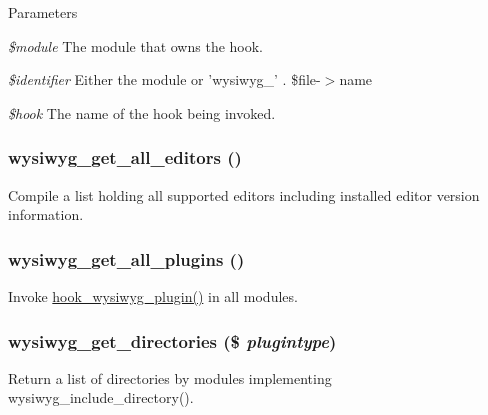\begin{DoxyParams}{Parameters}
\item[{\em \$module}]The module that owns the hook. \item[{\em \$identifier}]Either the module or 'wysiwyg\_\-' . \$file-\/$>$name \item[{\em \$hook}]The name of the hook being invoked. \end{DoxyParams}
\hypertarget{group__wysiwyg__api_gaf92d888d31e7e1adc2b7d8e763f62b33}{
\subsubsection[{wysiwyg\_\-get\_\-all\_\-editors}]{\setlength{\rightskip}{0pt plus 5cm}wysiwyg\_\-get\_\-all\_\-editors ()}}
\label{group__wysiwyg__api_gaf92d888d31e7e1adc2b7d8e763f62b33}
Compile a list holding all supported editors including installed editor version information. \hypertarget{group__wysiwyg__api_ga4b254b0ad93a619180087364bc415cde}{
\subsubsection[{wysiwyg\_\-get\_\-all\_\-plugins}]{\setlength{\rightskip}{0pt plus 5cm}wysiwyg\_\-get\_\-all\_\-plugins ()}}
\label{group__wysiwyg__api_ga4b254b0ad93a619180087364bc415cde}
Invoke \hyperlink{wysiwyg_8api_8php_abad2b35b32be0b20d73006b73205045c}{hook\_\-wysiwyg\_\-plugin()} in all modules. \hypertarget{group__wysiwyg__api_ga47660e98db185a3c9de431b94e280977}{
\subsubsection[{wysiwyg\_\-get\_\-directories}]{\setlength{\rightskip}{0pt plus 5cm}wysiwyg\_\-get\_\-directories (\$ {\em plugintype})}}
\label{group__wysiwyg__api_ga47660e98db185a3c9de431b94e280977}
Return a list of directories by modules implementing wysiwyg\_\-include\_\-directory().


